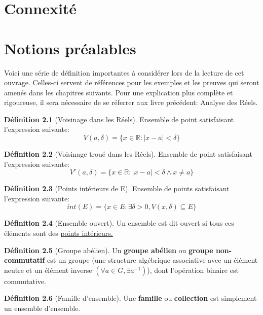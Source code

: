 \documentclass[12pt]{book}
\let\Bbb\mathbb
\newcommand\todo[1]{\phantom{#1}}
\theoremstyle{definition}
\newtheorem{definition}{Définition}[section]
\begin{document}
\chapter{Connexité}

\appendix
\chapter{Notions préalables}
Voici une série de définition importantes à considérer lors de la lecture de cet ouvrage. Celles-ci servent
de références pour les exemples et les preuves qui seront amenés dans les chapitres suivants. Pour une explication
plus complète et rigoureuse, il sera nécessaire de se réferrer aux livre précédent: Analyse des Réels.

\begin{definition}[Voisinage dans les Réels]
    \label{def:voisinage_reels}
    Ensemble de point satisfaisant l'expression
    suivante: $$V(a, \delta) = \{ x \in \Bbb R : |x - a| < \delta \}$$
\end{definition}

\begin{definition}[Voisinage troué dans les Réels]
    \label{def:voisinage_troue_reels}
    Ensemble de point satisfaisant l'expression
    suivante: $$V'(a, \delta) = \{ x \in \Bbb R : |x - a| < \delta \land x \neq a \}$$
\end{definition}

\begin{definition}[Points intérieurs de E]
    \label{def:point_int}
    Ensemble de points satisfaisant l'expression
    suivante: $$int(E) = \{ x \in E : \exists \delta > 0, V(x, \delta) \subseteq E \} $$
\end{definition}

\begin{definition}[Ensemble ouvert]
    \label{def:ensemble_ouvert}
    Un ensemble est dit ouvert si tous ces éléments sont des \hyperref[def:point_int]{points intérieurs.}
\end{definition}

\begin{definition}[Groupe abélien]
    \label{def:groupe_abelien}
    Un \textbf{groupe abélien} ou \textbf{groupe non-commutatif} est un groupe
    (une structure algébrique associative avec un élément neutre et un élément inverse $(\forall a \in G, \exists a^{-1})$), 
    dont l'opération binaire est commutative.
\end{definition}

\begin{definition}[Famille d'ensemble]
    \label{def:famille}
    Une \textbf{famille} ou \textbf{collection} est simplement un ensemble d'ensemble.
\end{definition}
\todo{Add reference}
\end{document}
